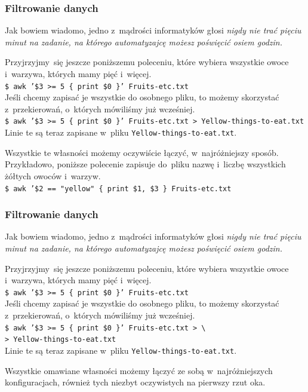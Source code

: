 \documentclass[10pt,t]{beamer}
\begin{document}
\begin{frame}
  \frametitle{Filtrowanie danych}


  Jak bowiem wiadomo, jedno z~mądrości informatyków głosi \textit{nigdy
    nie trać pięciu minut na zadanie, na którego automatyzajcę możesz
    poświęcić osiem godzin.}

  Przyjrzyjmy~się jeszcze poniższemu poleceniu, które wybiera
  wszystkie owoce i~warzywa, których mamy pięć i~więcej. \\
  \texttt{\$ awk '\$3 >= 5 \{ print \$0 \}' Fruits-etc.txt } \\
  Jeśli chcemy zapisać je wszystkie do osobnego pliku, to możemy skorzystać
  z~przekierowań, o~których mówiliśmy już wcześniej. \\
  \texttt{\$ awk '\$3 >= 5 \{ print \$0 \}' Fruits-etc.txt >
    Yellow-things-to-eat.txt} \\
  Linie te są teraz zapisane w~pliku
  \texttt{Yellow-things-to-eat.txt}.

  Wszystkie te własności możemy oczywiście łączyć, w~najróżniejszy sposób.
  Przykładowo, poniższe polecenie zapisuje do~pliku nazwę i~liczbę
  wszystkich żółtych owoców i~warzyw. \\
  \texttt{\$ awk '\$2 == "yellow" \{ print \$1, \$3 \} Fruits-etc.txt}

\end{frame}





\begin{frame}
  \frametitle{Filtrowanie danych}


  Jak bowiem wiadomo, jedno z~mądrości informatyków głosi \textit{nigdy
    nie trać pięciu minut na zadanie, na którego automatyzajcę możesz
    poświęcić osiem godzin.}

  Przyjrzyjmy~się jeszcze poniższemu poleceniu, które wybiera
  wszystkie owoce i~warzywa, których mamy pięć i~więcej. \\
  \texttt{\$ awk '\$3 >= 5 \{ print \$0 \}' Fruits-etc.txt } \\
  Jeśli chcemy zapisać je wszystkie do osobnego pliku, to możemy skorzystać
  z~przekierowań, o~których mówiliśmy już wcześniej. \\
  \texttt{\$ awk '\$3 >= 5 \{ print \$0 \}' Fruits-etc.txt >
    \textbackslash} \\
  \texttt{> Yellow-things-to-eat.txt} \\
  Linie te są teraz zapisane w~pliku
  \texttt{Yellow-things-to-eat.txt}.

  Wszystkie omawiane własności możemy łączyć ze sobą w~najróżniejszych
  konfiguracjach, również tych niezbyt oczywistych na pierwszy rzut oka.

\end{frame}
\end{document}
